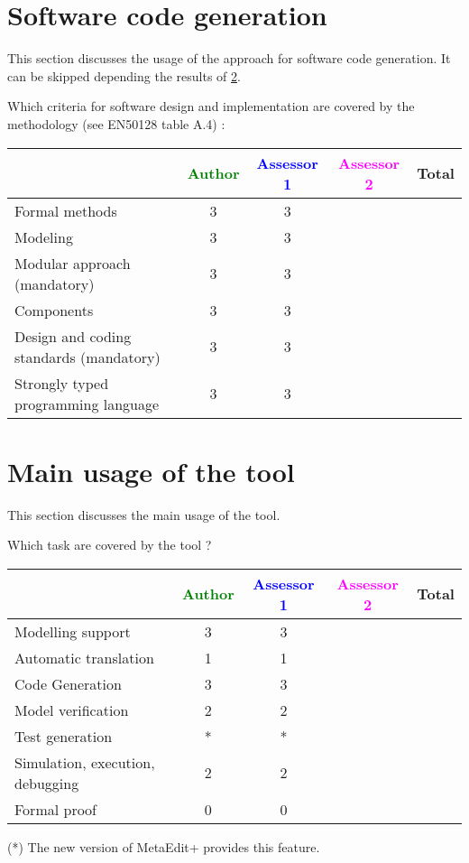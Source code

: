 \section{Software code generation}
This section discusses the usage of the approach for software code generation.
It can be skipped depending the results of \ref{main_usage}.

Which criteria for software design and implementation are covered by the methodology
(see EN50128 table A.4) :

\begin{tabular}{|l | c | c | c | c|}
\hline
& \textcolor{green}{Author} & \textcolor{blue}{Assessor 1} & \textcolor{magenta}{Assessor 2} & Total \\
\hline
Formal methods  &3 &3 & &  \\
\hline 
Modeling  &3 &3 & &  \\
\hline
Modular approach (mandatory) &3 &3 & &  \\
\hline
Components &3 &3 & &  \\
\hline
Design and coding standards (mandatory) &3 &3 & &  \\
\hline
Strongly typed programming language &3 &3 & &  \\
\hline

\end{tabular}



\section{Main usage of the tool}
\label{main_usage}

This section discusses the main usage of the tool.

Which task are covered by the tool ?


\begin{tabular}{|l | c | c | c | c|}
\hline
& \textcolor{green}{Author} & \textcolor{blue}{Assessor 1} & \textcolor{magenta}{Assessor 2} & Total \\
\hline 
Modelling support &3 &3 & &  \\
\hline
Automatic translation  &1 &1 & & \\
\hline
Code Generation  &3 &3 & & \\
\hline
Model verification &2 &2 & & \\
\hline
Test generation &* &* & & \\
\hline
Simulation, execution, debugging &2 &2 & & \\
\hline
Formal proof &0 &0 & & \\
\hline
\end{tabular}
\begin{author_comment}
(*) The new version of MetaEdit+ provides this feature.
\end{author_comment}

